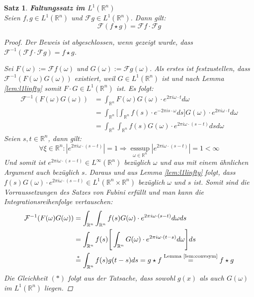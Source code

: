 \documentclass{article}
\newcommand{\R}[0]{\mathbb{R}}
\newcommand{\F}[0]{\mathcal{F}}
\newtheorem{thm}{Satz}
\DeclareMathOperator{\esssup}{esssup}
\begin{document}
\begin{thm}\label{thm:convinvl1}
    \textbf{Faltungssatz im $L^1(\R^n)$} \\
    Seien $f,g \in L^1(\R^n)$ und $\mathcal{F}g \in L^1(\R^n)$. Dann gilt:
    \begin{equation}
        \mathcal{F}(f \star g) = \mathcal{F}f \cdot \mathcal{F}g
    \end{equation}

    \begin{proof} \cite[S. 371f.]{howell2016principles}
        Der Beweis ist abgeschlossen, wenn gezeigt wurde, dass $\F^{-1} (\F f \cdot \F g) = f \star g$. 
        
        Sei $F(\omega) := \F f(\omega)$ und $G(\omega) := \F g(\omega)$. Als erstes ist festzustellen, dass $\F^{-1} (F(\omega) G(\omega))$ existiert, weil
        $G \in L^1(\R^n)$ ist und nach Lemma \ref{lem:l1linfty} somit $F \cdot G \in L^1(\R^n)$ ist. Es folgt: \\
        \begin{align*}
            \F^{-1} (F(\omega) G(\omega)) &= \int_{\R^n} F(\omega) G(\omega) \cdot e^{2\pi i \omega \cdot t} d\omega \\
            &= \int_{\R^n} \Bigg\lbrack \int_{\R^n} f(s) \cdot e^{-2\pi i s \cdot \omega} ds \Bigg\rbrack G(\omega) \cdot e^{2\pi i \omega \cdot t} d\omega \\
            &= \int_{\R^n} \int_{\R^n} f(s) G(\omega) \cdot e^{2\pi i \omega \cdot (s - t)} ds d\omega
        \end{align*}
        Seien $s,t \in \R^n$, dann gilt:
        \begin{equation*}
            \forall \xi \in \R^n: |e^{2\pi i \omega \cdot (s - t)}| = 1 \Rightarrow \esssup\limits_{\omega \in \R^n} |e^{2\pi i \omega \cdot (s - t)}| = 1 < \infty
        \end{equation*}
        Und somit ist $e^{2\pi i \omega \cdot (s - t)} \in L^{\infty}(\R^n)$ bezüglich $\omega$ und aus mit einem ähnlichen Argument auch bezüglich $s$.
        Daraus und aus Lemma \ref{lem:l1linfty} folgt, dass $f(s) G(\omega) \cdot e^{2\pi i \omega \cdot (s - t)} \in L^1(\R^n \times \R^n)$ bezüglich $\omega$ und $s$ ist.
        Somit sind die Vorraussetzungen des Satzes von Fubini erfüllt und man kann die Integrationsreihenfolge vertauschen:
        \begin{align*}
            \F^{-1} (F(\omega) G(\omega)) &= \int_{\R^n} \int_{\R^n} f(s) G(\omega) \cdot e^{2\pi i \omega \cdot (s - t)} d\omega ds \\
            &= \int_{\R^n} f(s) \Bigg \lbrack \int_{\R^n} G(\omega) \cdot e^{2\pi i \omega \cdot (t - s)} d\omega \Bigg \rbrack ds \\
            &\overset{*}{=} \int_{\R^n} f(s) g(t-s) ds = g \star f \overset{\text{Lemma \ref{lem:convsym}}}{=} f \star g
        \end{align*}
        Die Gleichheit $(*)$ folgt aus der Tatsache, dass sowohl $g(x)$ als auch $G(\omega)$ im $L^1(\R^n)$ liegen.
    \end{proof}
\end{thm}
\end{document}
